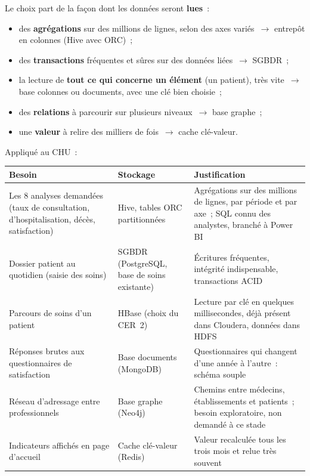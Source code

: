 \noindent Le choix part de la façon dont les données seront \textbf{lues}~:
\begin{itemize}
	\item des \textbf{agrégations} sur des millions de lignes, selon des axes variés~$\rightarrow$ entrepôt en colonnes (Hive avec ORC)~;
	\item des \textbf{transactions} fréquentes et sûres sur des données liées~$\rightarrow$ SGBDR~;
	\item la lecture de \textbf{tout ce qui concerne un élément} (un patient), très vite~$\rightarrow$ base colonnes ou documents, avec une clé bien choisie~;
	\item des \textbf{relations} à parcourir sur plusieurs niveaux~$\rightarrow$ base graphe~;
	\item une \textbf{valeur} à relire des milliers de fois~$\rightarrow$ cache clé-valeur.
\end{itemize}

\noindent Appliqué au CHU~:

\begin{center}
\small
\begin{tabularx}{\textwidth}{>{\raggedright\arraybackslash}X >{\raggedright\arraybackslash}p{3cm} >{\raggedright\arraybackslash}X}
\toprule
\textbf{Besoin} & \textbf{Stockage} & \textbf{Justification} \\
\midrule
Les 8 analyses demandées (taux de consultation, d'hospitalisation, décès, satisfaction) & Hive, tables ORC partitionnées & Agrégations sur des millions de lignes, par période et par axe~; SQL connu des analystes, branché à Power BI \\
Dossier patient au quotidien (saisie des soins) & SGBDR (PostgreSQL, base de soins existante) & Écritures fréquentes, intégrité indispensable, transactions ACID \\
Parcours de soins d'un patient & HBase (choix du CER~2) & Lecture par clé en quelques millisecondes, déjà présent dans Cloudera, données dans HDFS \\
Réponses brutes aux questionnaires de satisfaction & Base documents (MongoDB) & Questionnaires qui changent d'une année à l'autre~: schéma souple \\
Réseau d'adressage entre professionnels & Base graphe (Neo4j) & Chemins entre médecins, établissements et patients~; besoin exploratoire, non demandé à ce stade \\
Indicateurs affichés en page d'accueil & Cache clé-valeur (Redis) & Valeur recalculée tous les trois mois et relue très souvent \\
\bottomrule
\end{tabularx}
\end{center}

